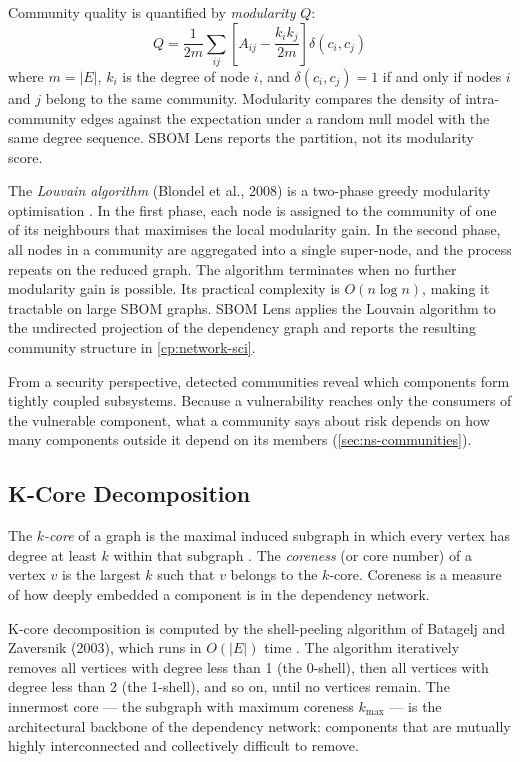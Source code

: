 Community quality is quantified by \textit{modularity} \(Q\):
\[
    Q = \frac{1}{2m} \sum_{ij} \left[ A_{ij} - \frac{k_i k_j}{2m} \right] \delta(c_i, c_j)
\]
where \(m = |E|\), \(k_i\) is the degree of node \(i\), and \(\delta(c_i, c_j) = 1\) if and only if nodes \(i\) and \(j\) belong to the same community. Modularity compares the density of intra-community edges against the expectation under a random null model with the same degree sequence. SBOM Lens reports the partition, not its modularity score.

The \textit{Louvain algorithm} (Blondel et al., 2008) is a two-phase greedy modularity optimisation \citep{Blondel2008}. In the first phase, each node is assigned to the community of one of its neighbours that maximises the local modularity gain. In the second phase, all nodes in a community are aggregated into a single super-node, and the process repeats on the reduced graph. The algorithm terminates when no further modularity gain is possible. Its practical complexity is \(O(n \log n)\), making it tractable on large SBOM graphs. SBOM Lens applies the Louvain algorithm to the undirected projection of the dependency graph and reports the resulting community structure in \autoref{cp:network-sci}.

From a security perspective, detected communities reveal which components form tightly coupled subsystems. Because a vulnerability reaches only the consumers of the vulnerable component, what a community says about risk depends on how many components outside it depend on its members (\autoref{sec:ns-communities}).


\subsection{K-Core Decomposition}
\label{sec:kcore}

The \textit{\(k\)-core} of a graph is the maximal induced subgraph in which every vertex has degree at least \(k\) within that subgraph \citep{Batagelj2003}. The \textit{coreness} (or core number) of a vertex \(v\) is the largest \(k\) such that \(v\) belongs to the \(k\)-core. Coreness is a measure of how deeply embedded a component is in the dependency network.

K-core decomposition is computed by the shell-peeling algorithm of Batagelj and Zaversnik (2003), which runs in \(O(|E|)\) time \citep{Batagelj2003}. The algorithm iteratively removes all vertices with degree less than 1 (the 0-shell), then all vertices with degree less than 2 (the 1-shell), and so on, until no vertices remain. The innermost core --- the subgraph with maximum coreness \(k_{\max}\) --- is the architectural backbone of the dependency network: components that are mutually highly interconnected and collectively difficult to remove.

